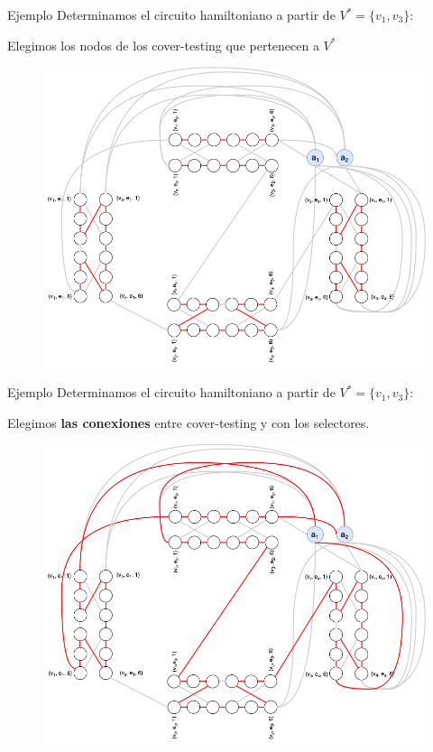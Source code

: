 \documentclass{beamer}
\begin{document}
\begin{frame}{Ejemplo}
    Determinamos el circuito hamiltoniano a partir de $V^*=\{v_1, v_3\}$:
    \begin{block}{}
        Elegimos los nodos de los cover-testing que pertenecen a $V^*$
    \end{block}
    \begin{figure}
        \centering
        \includegraphics[scale=0.23]{images/example-6.png}
    \end{figure}
\end{frame}

\begin{frame}{Ejemplo}
    Determinamos el circuito hamiltoniano a partir de $V^*=\{v_1, v_3\}$:
    \begin{block}{}
        Elegimos \textbf{las conexiones} entre cover-testing y con los selectores.
    \end{block}
    \begin{figure}
        \centering
        \includegraphics[scale=0.23]{images/example-7.png}
    \end{figure}
\end{frame}
\end{document}
